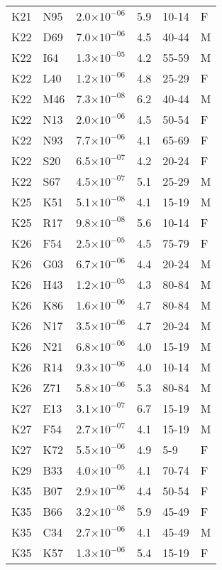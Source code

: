 \begin{longtable}{lllrll}
   K21 & N95 & 2.0$\times10^{-06}$ & 5.9 & 10-14 & F \\ 
   K22 & D69 & 7.0$\times10^{-06}$ & 4.5 & 40-44 & M \\ 
   K22 & I64 & 1.3$\times10^{-05}$ & 4.2 & 55-59 & M \\ 
   K22 & L40 & 1.2$\times10^{-06}$ & 4.8 & 25-29 & F \\ 
   K22 & M46 & 7.3$\times10^{-08}$ & 6.2 & 40-44 & M \\ 
   K22 & N13 & 2.0$\times10^{-06}$ & 4.5 & 50-54 & F \\ 
   K22 & N93 & 7.7$\times10^{-06}$ & 4.1 & 65-69 & F \\ 
   K22 & S20 & 6.5$\times10^{-07}$ & 4.2 & 20-24 & F \\ 
   K22 & S67 & 4.5$\times10^{-07}$ & 5.1 & 25-29 & M \\ 
   K25 & K51 & 5.1$\times10^{-08}$ & 4.1 & 15-19 & M \\ 
   K25 & R17 & 9.8$\times10^{-08}$ & 5.6 & 10-14 & F \\ 
   K26 & F54 & 2.5$\times10^{-05}$ & 4.5 & 75-79 & F \\ 
   K26 & G03 & 6.7$\times10^{-06}$ & 4.4 & 20-24 & M \\ 
   K26 & H43 & 1.2$\times10^{-05}$ & 4.3 & 80-84 & M \\ 
   K26 & K86 & 1.6$\times10^{-06}$ & 4.7 & 80-84 & M \\ 
   K26 & N17 & 3.5$\times10^{-06}$ & 4.7 & 20-24 & M \\ 
   K26 & N21 & 6.8$\times10^{-06}$ & 4.0 & 15-19 & M \\ 
   K26 & R14 & 9.3$\times10^{-06}$ & 4.0 & 10-14 & M \\ 
   K26 & Z71 & 5.8$\times10^{-06}$ & 5.3 & 80-84 & M \\ 
   K27 & E13 & 3.1$\times10^{-07}$ & 6.7 & 15-19 & M \\ 
   K27 & F54 & 2.7$\times10^{-07}$ & 4.1 & 15-19 & M \\ 
   K27 & K72 & 5.5$\times10^{-06}$ & 4.9 & 5-9 & F \\ 
   K29 & B33 & 4.0$\times10^{-05}$ & 4.1 & 70-74 & F \\ 
   K35 & B07 & 2.9$\times10^{-06}$ & 4.4 & 50-54 & F \\ 
   K35 & B66 & 3.2$\times10^{-08}$ & 5.9 & 45-49 & F \\ 
   K35 & C34 & 2.7$\times10^{-06}$ & 4.1 & 45-49 & M \\ 
   K35 & K57 & 1.3$\times10^{-06}$ & 5.4 & 15-19 & F \\ 

\end{longtable}
